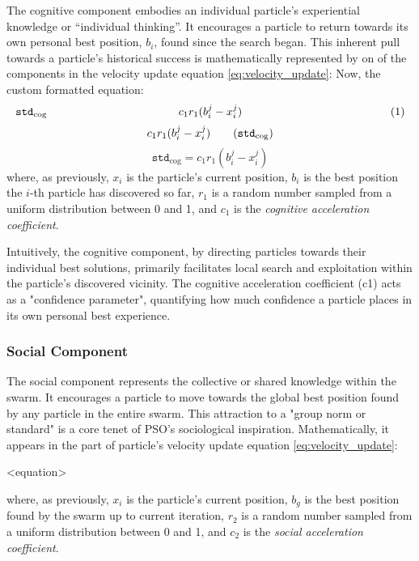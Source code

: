 {The cognitive component embodies an individual particle's experiential knowledge or ``individual thinking''. It encourages a particle to return towards its own personal best position, $b_i$, found since the search began. This inherent pull towards a particle's historical success is mathematically represented by on of the components in the velocity update equation \eqref{eq:velocity_update}:
Now, the custom formatted equation:
\begin{equation*}
  \makebox[\linewidth][c]{%
    \makebox[0pt][l]{$\texttt{std}_\text{cog}$}%
    \hfill%
    $c_1 r_1 (b_{i}^{j} - x_{i}^{j})$%
    \hfill%
    \refstepcounter{equation}%
    \makebox[0pt][r]{(\theequation)}%
  }
  \label{eq:custom_short_example}
\end{equation*}
\begin{equation}
c_1 r_1 (b_{i}^{j} - x_{i}^{j}) \tag{$\texttt{std}_\text{cog}$}
\end{equation}
\begin{equation}
\texttt{std}_\text{cog} = c_1 r_1 (b_{i}^{j} - x_{i}^{j})
\end{equation}
where, as previously, $x_i$ is the particle's current position, $b_i$ is the best position the $i$-th particle has discovered so far, $r_1$ is a random number sampled from a uniform distribution between 0 and 1, and $c_1$ is the \textit{cognitive acceleration coefficient}.


Intuitively, the cognitive component, by directing particles towards their individual best solutions, primarily facilitates local search and exploitation within the particle's discovered vicinity.
The cognitive acceleration coefficient (c1) acts as a "confidence parameter", quantifying how much confidence a particle places in its own personal best experience. 


\subsubsection{Social Component}

The social component represents the collective or shared knowledge within the swarm. It encourages a particle to move towards the global best position found by any particle in the entire swarm. This attraction to a "group norm or standard" is a core tenet of PSO's sociological inspiration. Mathematically, it appears in the part of particle's velocity update equation  \eqref{eq:velocity_update}:

<equation>

where, as previously, $x_i$ is the particle's current position, $b_g$ is the best position found by the swarm up to current iteration, $r_2$ is a random number sampled from a uniform distribution between 0 and 1, and $c_2$ is the \textit{social acceleration coefficient}.


}
